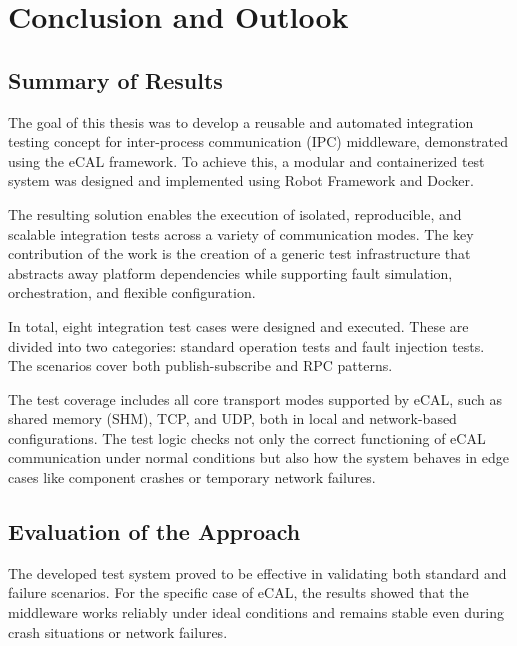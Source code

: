 \clearpage
\section{Conclusion and Outlook}


\subsection*{Summary of Results}

The goal of this thesis was to develop a reusable and automated integration testing concept for inter-process communication (IPC) middleware, demonstrated using the eCAL framework. To achieve this, a modular and containerized test system was designed and implemented using Robot Framework and Docker.

\vspace{1em}
The resulting solution enables the execution of isolated, reproducible, and scalable integration tests across a variety of communication modes. The key contribution of the work is the creation of a generic test infrastructure that abstracts away platform dependencies while supporting fault simulation, orchestration, and flexible configuration.

\vspace{1em}
In total, eight integration test cases were designed and executed. These are divided into two categories: standard operation tests and fault injection tests. The scenarios cover both publish-subscribe and RPC patterns.

\vspace{1em}
The test coverage includes all core transport modes supported by eCAL, such as shared memory (SHM), TCP, and UDP, both in local and network-based configurations. The test logic checks not only the correct functioning of eCAL communication under normal conditions but also how the system behaves in edge cases like component crashes or temporary network failures.

\vspace{1em}
\subsection*{Evaluation of the Approach}

The developed test system proved to be effective in validating both standard and failure scenarios. For the specific case of eCAL, the results showed that the middleware works reliably under ideal conditions and remains stable even during crash situations or network failures.

